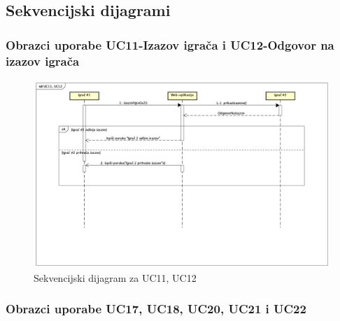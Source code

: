 			\subsection{Sekvencijski dijagrami}
				
				\subsubsection{Obrazci uporabe UC11-Izazov igrača i UC12-Odgovor na izazov igrača}
				
				\begin{figure}[H]
        			\includegraphics[scale=0.4]{slike/Sekvencijski dijagrami/UC11, UC12.png}
        			\centering
        			\caption{Sekvencijski dijagram za UC11, UC12}
        			\label{fig:promjene}
        		\end{figure}
				
				\subsubsection{Obrazci uporabe UC17, UC18, UC20, UC21 i UC22}
				
